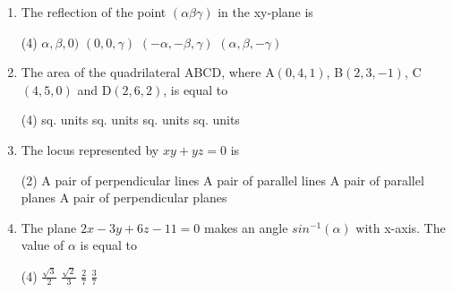 \documentclass[12pt]{article}
\begin{document}
\begin{enumerate}
\begin{tasks}
\end{tasks}
\item The reflection of the point $(\alpha \beta \gamma )$ in the xy-plane is 
\begin{tasks}(4)
	\task $\alpha,\beta,0)$
	\task $(0,0,\gamma)$
	\task $(-\alpha,-\beta,\gamma)$
	\task $(\alpha,\beta,-\gamma)$
\end{tasks}
\item The area of the quadrilateral ABCD, where A$(0,4,1)$, B$(2,3,-1)$, C$(4,5,0)$ and D$(2,6,2)$, is equal to 
\begin{tasks}(4)
	 sq. units
	 sq. units 
	 sq. units 
	 sq. units
\end{tasks}
\item The locus represented by $xy+yz=0$ is 
\begin{tasks}(2)
	\task A pair of perpendicular lines
	\task A pair of parallel lines
	\task A pair of parallel planes 
	\task A pair of perpendicular planes
\end{tasks}
\item The plane $2x-3y+6z-11=0$ makes an angle $sin^{-1}(\alpha)$ with x-axis. The value of $\alpha$ is equal to 
\begin{tasks}(4)
	\task \(\displaystyle \frac{\sqrt{3}}{2}\)
	\task \(\displaystyle \frac{\sqrt{2}}{3}\)
	\task \(\displaystyle \frac{2}{7}\)
	\task \(\displaystyle \frac{3}{7}\)
\end{tasks}




\end{enumerate}
\end{document}
